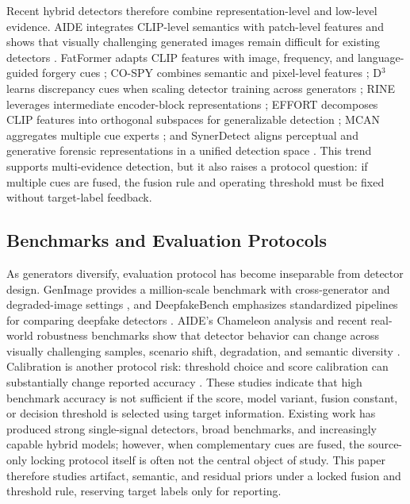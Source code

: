 \documentclass[letterpaper,journal]{IEEEtran}
\begin{document}
Recent hybrid detectors therefore combine representation-level and low-level evidence. AIDE integrates CLIP-level semantics with patch-level features and shows that visually challenging generated images remain difficult for existing detectors \cite{yan2025aide}. FatFormer adapts CLIP features with image, frequency, and language-guided forgery cues \cite{liu2024fatformer}; CO-SPY combines semantic and pixel-level features \cite{cheng2025cospy}; D$^3$ learns discrepancy cues when scaling detector training across generators \cite{yang2025d3}; RINE leverages intermediate encoder-block representations \cite{koutlis2024rine}; EFFORT decomposes CLIP features into orthogonal subspaces for generalizable detection \cite{yan2024effort}; MCAN aggregates multiple cue experts \cite{tan2026mcan}; and SynerDetect aligns perceptual and generative forensic representations in a unified detection space \cite{li2026synerdetect}. This trend supports multi-evidence detection, but it also raises a protocol question: if multiple cues are fused, the fusion rule and operating threshold must be fixed without target-label feedback.

\subsection{Benchmarks and Evaluation Protocols}
As generators diversify, evaluation protocol has become inseparable from detector design. GenImage provides a million-scale benchmark with cross-generator and degraded-image settings \cite{zhu2023genimage}, and DeepfakeBench emphasizes standardized pipelines for comparing deepfake detectors \cite{yan2023deepfakebench}. AIDE's Chameleon analysis and recent real-world robustness benchmarks show that detector behavior can change across visually challenging samples, scenario shift, degradation, and semantic diversity \cite{yan2025aide,li2025rrdataset}. Calibration is another protocol risk: threshold choice and score calibration can substantially change reported accuracy \cite{yang2026calibrated}. These studies indicate that high benchmark accuracy is not sufficient if the score, model variant, fusion constant, or decision threshold is selected using target information. Existing work has produced strong single-signal detectors, broad benchmarks, and increasingly capable hybrid models; however, when complementary cues are fused, the source-only locking protocol itself is often not the central object of study. This paper therefore studies artifact, semantic, and residual priors under a locked fusion and threshold rule, reserving target labels only for reporting.
\end{document}

